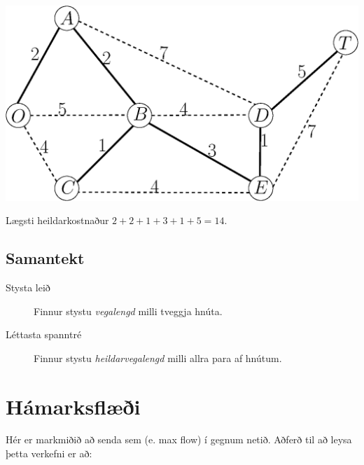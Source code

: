 \begin{lausn}\hspace{.1cm}
\begin{center}
  \includegraphics[width=0.7\columnwidth]{figs/seervada-tree.eps}
\end{center}
Lægsti heildarkostnaður $2+2+1+3+1+5=14$.
\end{lausn}


\subsection{Samantekt}
\begin{description}
 \item[Stysta leið] Finnur stystu \emph{vegalengd} milli tveggja hnúta.
 \item[Léttasta spanntré] Finnur stystu \emph{heildarvegalengd} milli allra para af hnútum.
\end{description}

\newpage

\section{Hámarksflæði}
Hér er markmiðið að senda sem  (e. max flow) í gegnum netið. Aðferð
til að leysa þetta verkefni er að:


